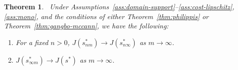 \documentclass[12pt,leqno]{amsart}
\newtheorem{theorem}{Theorem}
\begin{document}
\begin{theorem}~\label{thm: cp-conv-to-cpt-cpc-conv-to-nlp} 
Under Assumptions~\ref{ass:domain-support}--\ref{ass:cost-lipschitz}, \ref{ass:mono}, and the conditions of either Theorem~\ref{thm:philippis} or Theorem~\ref{thm:gangbo-mccann}, we have the following:
\begin{enumerate}[label={(\roman*)},itemindent=1em]
\item For a fixed $n>0$,  $J(s_{nm}^*)\rightarrow J(s_{n\infty}^*)$ as $m\rightarrow\infty$.\label{thm: cp-conv-to-cpt-cpc-conv-to-nlp1} 
\item $J(s_{\infty m}^*)\rightarrow J(s^*)$ as $m\rightarrow\infty$. \label{thm: cp-conv-to-cpt-cpc-conv-to-nlp2} 
\end{enumerate}
\end{theorem}
\end{document}
